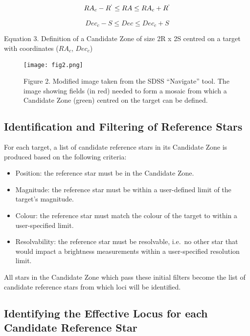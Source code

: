 \documentclass[]{elsarticle} %
\providecommand{\tightlist}{%
  \setlength{\itemsep}{0pt}\setlength{\parskip}{0pt}}
\begin{document}
\[RA_c - R^` \leq RA \leq RA_c + R^` \]

\[Dec_c - S \leq Dec \leq Dec_c + S\]

Equation 3. Definition of a Candidate Zone of size 2R x 2S centred on a
target with coordinates (\(RA_c\), \(Dec_c\))

\begin{figure}
\centering
\texttt{[image: fig2.png]}
\caption{Figure 2. Modified image taken from the SDSS ``Navigate'' tool.
The image showing fields (in red) needed to form a mosaic from which a
Candidate Zone (green) centred on the target can be defined.}
\end{figure}

\hypertarget{identification-and-filtering-of-reference-stars}{%
\subsection{Identification and Filtering of Reference
Stars}\label{identification-and-filtering-of-reference-stars}}

For each target, a list of candidate reference stars in its Candidate
Zone is produced based on the following criteria:

\begin{itemize}
\tightlist
\item
  Position: the reference star must be in the Candidate Zone.
\item
  Magnitude: the reference star must be within a user-defined limit of
  the target's magnitude.
\item
  Colour: the reference star must match the colour of the target to
  within a user-specified limit.
\item
  Resolvability: the reference star must be resolvable, i.e.~no other
  star that would impact a brightness measurements within a
  user-specified resolution limit.
\end{itemize}

All stars in the Candidate Zone which pass these initial filters become
the list of candidate reference stars from which loci will be
identified.

\hypertarget{identifying-the-effective-locus-for-each-candidate-reference-star}{%
\subsection{Identifying the Effective Locus for each Candidate Reference
Star}\label{identifying-the-effective-locus-for-each-candidate-reference-star}}
\end{document}
